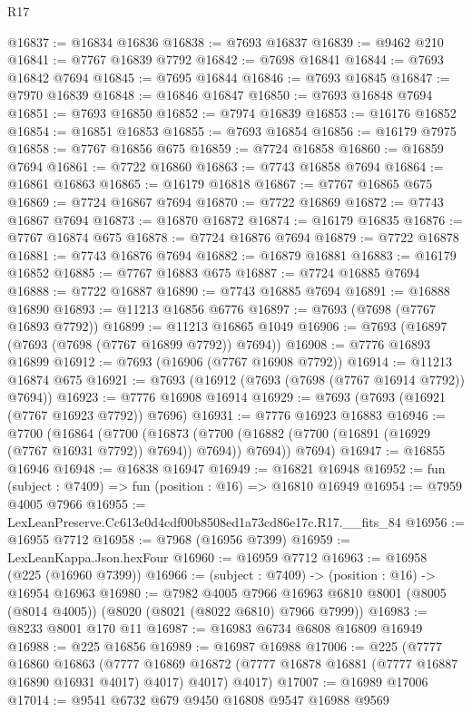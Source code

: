 \begin{lexlean}{R17}
\begin{coremodule}
@16837 := @16834 @16836
@16838 := @7693 @16837
@16839 := @9462 @210
@16841 := @7767 @16839 @7792
@16842 := @7698 @16841
@16844 := @7693 @16842 @7694
@16845 := @7695 @16844
@16846 := @7693 @16845
@16847 := @7970 @16839
@16848 := @16846 @16847
@16850 := @7693 @16848 @7694
@16851 := @7693 @16850
@16852 := @7974 @16839
@16853 := @16176 @16852
@16854 := @16851 @16853
@16855 := @7693 @16854
@16856 := @16179 @7975
@16858 := @7767 @16856 @675
@16859 := @7724 @16858
@16860 := @16859 @7694
@16861 := @7722 @16860
@16863 := @7743 @16858 @7694
@16864 := @16861 @16863
@16865 := @16179 @16818
@16867 := @7767 @16865 @675
@16869 := @7724 @16867 @7694
@16870 := @7722 @16869
@16872 := @7743 @16867 @7694
@16873 := @16870 @16872
@16874 := @16179 @16835
@16876 := @7767 @16874 @675
@16878 := @7724 @16876 @7694
@16879 := @7722 @16878
@16881 := @7743 @16876 @7694
@16882 := @16879 @16881
@16883 := @16179 @16852
@16885 := @7767 @16883 @675
@16887 := @7724 @16885 @7694
@16888 := @7722 @16887
@16890 := @7743 @16885 @7694
@16891 := @16888 @16890
@16893 := @11213 @16856 @6776
@16897 := @7693 (@7698 (@7767 @16893 @7792))
@16899 := @11213 @16865 @1049
@16906 := @7693 (@16897 (@7693 (@7698 (@7767 @16899 @7792)) @7694))
@16908 := @7776 @16893 @16899
@16912 := @7693 (@16906 (@7767 @16908 @7792))
@16914 := @11213 @16874 @675
@16921 := @7693 (@16912 (@7693 (@7698 (@7767 @16914 @7792)) @7694))
@16923 := @7776 @16908 @16914
@16929 := @7693 (@7693 (@16921 (@7767 @16923 @7792)) @7696)
@16931 := @7776 @16923 @16883
@16946 := @7700
    (@16864
      (@7700
        (@16873 (@7700 (@16882 (@7700 (@16891 (@16929 (@7767 @16931 @7792)) @7694)) @7694)) @7694))
      @7694)
@16947 := @16855 @16946
@16948 := @16838 @16947
@16949 := @16821 @16948
@16952 := fun (subject : @7409) => fun (position : @16) => @16810 @16949
@16954 := @7959 @4005 @7966
@16955 := LexLeanPreserve.Cc613c0d4cdf00b8508ed1a73cd86e17c.R17.__fits_84
@16956 := @16955 @7712
@16958 := @7968 (@16956 @7399)
@16959 := LexLeanKappa.Json.hexFour
@16960 := @16959 @7712
@16963 := @16958 (@225 (@16960 @7399))
@16966 := (subject : @7409) -> (position : @16) -> @16954 @16963
@16980 := @7982
    @4005
    @7966
    @16963
    @6810
    @8001
    (@8005 (@8014 @4005))
    (@8020 (@8021 (@8022 @6810) @7966 @7999))
@16983 := @8233 @8001 @170 @11
@16987 := @16983 @6734 @6808 @16809 @16949
@16988 := @225 @16856
@16989 := @16987 @16988
@17006 := @225
    (@7777
      @16860
      @16863
      (@7777 @16869 @16872 (@7777 @16878 @16881 (@7777 @16887 @16890 @16931 @4017) @4017) @4017)
      @4017)
@17007 := @16989 @17006
@17014 := @9541 @6732 @679 @9450 @16808 @9547 @16988 @9569

\end{coremodule}
\end{lexlean}
